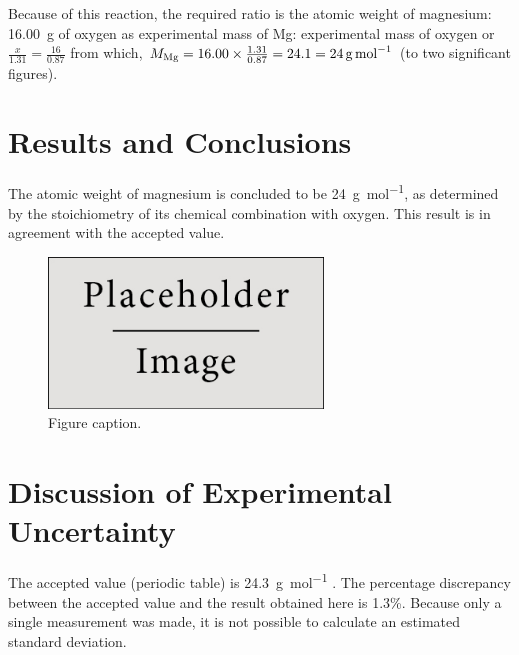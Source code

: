 \documentclass{article}
\begin{document}
Because of this reaction, the required ratio is the atomic weight of
magnesium: \SI{16.00}{\gram} of oxygen as experimental mass of Mg:
experimental mass of oxygen or $\frac{x}{1.31}=\frac{16}{0.87}$ from
which, $M_{\ce{Mg}} = 16.00 \times \frac{1.31}{0.87} = 24.1 =
\SI{24}{\gram\per\mole}$ (to two significant figures).


\section{Results and Conclusions}

The atomic weight of magnesium is concluded to be
\SI{24}{\gram\per\mol}, as determined by the stoichiometry of its
chemical combination with oxygen. This result is in agreement with the
accepted value.

\begin{figure}[h]
  \begin{center}
    \includegraphics[width=0.65\textwidth]{placeholder} %
    \caption{Figure caption.}
  \end{center}
\end{figure}


\section{Discussion of Experimental Uncertainty}

The accepted value (periodic table) is \SI{24.3}{\gram\per\mole}
\cite{Smith:2012qr}. The percentage discrepancy between the accepted
value and the result obtained here is 1.3\%. Because only a single
measurement was made, it is not possible to calculate an estimated
standard deviation.
\end{document}

